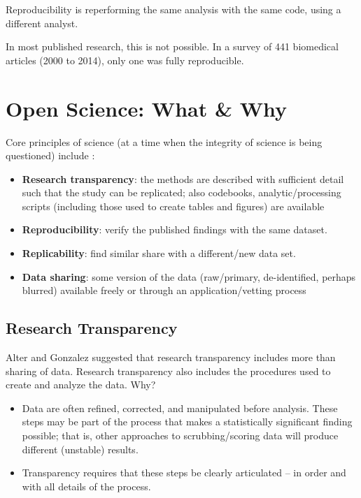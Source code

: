 \documentclass[
  english,
]{book}
\providecommand{\tightlist}{%
  \setlength{\itemsep}{0pt}\setlength{\parskip}{0pt}}
\begin{document}
Reproducibility is reperforming the same analysis with the same code, using a different analyst.

In most published research, this is not possible. In a survey of 441 biomedical articles (2000 to 2014), only one was fully reproducible.

\hypertarget{open-science-what-why}{%
\section{Open Science: What \& Why}\label{open-science-what-why}}

Core principles of science (at a time when the integrity of science is being questioned) include \citep{alter_responsible_2018}:

\begin{itemize}
\tightlist
\item
  \textbf{Research transparency}: the methods are described with sufficient detail such that the study can be replicated; also codebooks, analytic/processing scripts (including those used to create tables and figures) are available
\item
  \textbf{Reproducibility}: verify the published findings with the same dataset.
\item
  \textbf{Replicability}: find similar share with a different/new data set.
\item
  \textbf{Data sharing}: some version of the data (raw/primary, de-identified, perhaps blurred) available freely or through an application/vetting process
\end{itemize}

\hypertarget{research-transparency}{%
\subsection{Research Transparency}\label{research-transparency}}

Alter and Gonzalez \citeyearpar{alter_responsible_2018} suggested that research transparency includes more than sharing of data. Research transparency also includes the procedures used to create and analyze the data. Why?

\begin{itemize}
\tightlist
\item
  Data are often refined, corrected, and manipulated before analysis. These steps may be part of the process that makes a statistically significant finding possible; that is, other approaches to scrubbing/scoring data will produce different (unstable) results.\\
\item
  Transparency requires that these steps be clearly articulated -- in order and with all details of the process.
\end{itemize}
\end{document}
